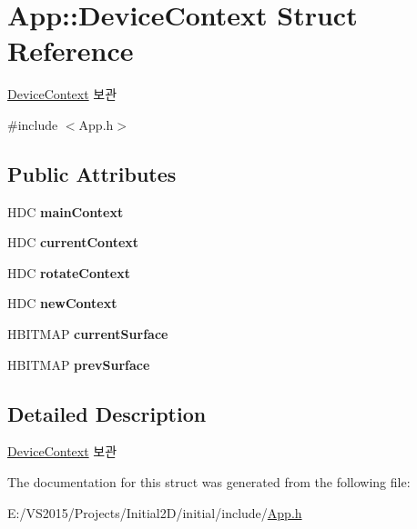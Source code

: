 \hypertarget{struct_app_1_1_device_context}{}\section{App\+::Device\+Context Struct Reference}
\label{struct_app_1_1_device_context}


\mbox{\hyperlink{struct_app_1_1_device_context}{Device\+Context}} 보관  




{\ttfamily \#include $<$App.\+h$>$}

\subsection*{Public Attributes}
\begin{DoxyCompactItemize}
\item 
\mbox{\label{struct_app_1_1_device_context_a8fc8c7e02ed5a063a8604b03dfabbd1b}} 
H\+DC {\bfseries main\+Context}
\item 
\mbox{\label{struct_app_1_1_device_context_a0a4c356d0849bce99e4f2f9abc59ec42}} 
H\+DC {\bfseries current\+Context}
\item 
\mbox{\label{struct_app_1_1_device_context_af6e1537152d57845c4d3a3eb84007c4e}} 
H\+DC {\bfseries rotate\+Context}
\item 
\mbox{\label{struct_app_1_1_device_context_aac5cf30686e692fa794d188fd951f0c0}} 
H\+DC {\bfseries new\+Context}
\item 
\mbox{\label{struct_app_1_1_device_context_a3e7ecbdf66a753da0f547a4c95872053}} 
H\+B\+I\+T\+M\+AP {\bfseries current\+Surface}
\item 
\mbox{\label{struct_app_1_1_device_context_a9a4f3d9a7a181cfd1b6764921fb8ba53}} 
H\+B\+I\+T\+M\+AP {\bfseries prev\+Surface}
\end{DoxyCompactItemize}


\subsection{Detailed Description}
\mbox{\hyperlink{struct_app_1_1_device_context}{Device\+Context}} 보관 

The documentation for this struct was generated from the following file\+:\begin{DoxyCompactItemize}
\item 
E\+:/\+V\+S2015/\+Projects/\+Initial2\+D/initial/include/\mbox{\hyperlink{_app_8h}{App.\+h}}\end{DoxyCompactItemize}
